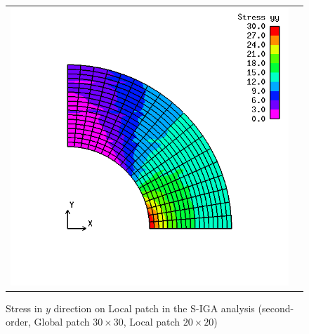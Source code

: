 \documentclass[12pt,a4j,fleqn]{jsarticle}
\begin{document}
\begin{figure}[hbtp]
  \begin{tabular}{cc}
    \begin{minipage}[t]{0.45\hsize}
      \centering
      \includegraphics[keepaspectratio, scale=0.18]
      {fig/2.png}
      \caption{Stress in $y$ direction on Local patch in the S-IGA analysis (second-order, Global patch $30\times 30$, Local patch $20\times 20$)}
      \label{fig:2}
    \end{minipage} &
    \begin{minipage}[t]{0.45\hsize}
      \centering
      \includegraphics[keepaspectratio, scale=0.18]

\end{minipage}
\end{tabular}
\end{figure}
\end{document}
